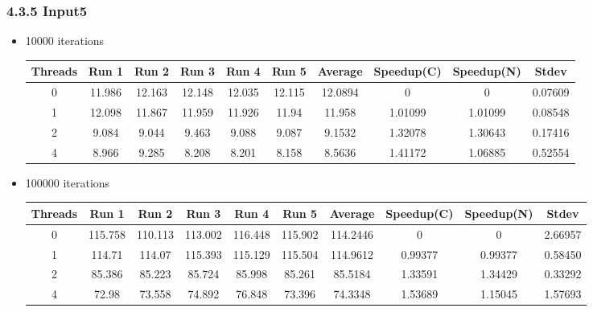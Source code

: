 \documentclass{article}
\begin{document}
\subsubsection*{4.3.5 Input5} 
 \begin{itemize}
\item 10000 iterations
\begin{center}
 \begin{adjustbox}{width=\columnwidth, center} 
 \begin{tabular}{ | |c | c c c c c | c | c c | c | |} \hline 
 Threads & Run 1 & Run 2 & Run 3 & Run 4 & Run 5 & Average & Speedup(C) & Speedup(N) & Stdev \\ [0.5ex] 
 \hline 
 \hline 
0& 11.986 & 12.163 & 12.148 & 12.035 & 12.115 & 12.0894 & 0 & 0 & 0.07609\\ 
 \hline
1& 12.098 & 11.867 & 11.959 & 11.926 & 11.94 & 11.958 & 1.01099 & 1.01099 & 0.08548\\ 
 \hline
2& 9.084 & 9.044 & 9.463 & 9.088 & 9.087 & 9.1532 & 1.32078 & 1.30643 & 0.17416\\ 
 \hline
4& 8.966 & 9.285 & 8.208 & 8.201 & 8.158 & 8.5636 & 1.41172 & 1.06885 & 0.52554\\ 
 \hline
\end{tabular} 
 \end{adjustbox} 
 \end{center} 
\item 100000 iterations
\begin{center}
 \begin{adjustbox}{width=\columnwidth, center} 
 \begin{tabular}{ | |c | c c c c c | c | c c | c | |} \hline 
 Threads & Run 1 & Run 2 & Run 3 & Run 4 & Run 5 & Average & Speedup(C) & Speedup(N) & Stdev \\ [0.5ex] 
 \hline 
 \hline 
0& 115.758 & 110.113 & 113.002 & 116.448 & 115.902 & 114.2446 & 0 & 0 & 2.66957\\ 
 \hline
1& 114.71 & 114.07 & 115.393 & 115.129 & 115.504 & 114.9612 & 0.99377 & 0.99377 & 0.58450\\ 
 \hline
2& 85.386 & 85.223 & 85.724 & 85.998 & 85.261 & 85.5184 & 1.33591 & 1.34429 & 0.33292\\ 
 \hline
4& 72.98 & 73.558 & 74.892 & 76.848 & 73.396 & 74.3348 & 1.53689 & 1.15045 & 1.57693\\ 
 \hline
\end{tabular} 
 \end{adjustbox} 
 \end{center} 
\end{itemize}
\end{document}
